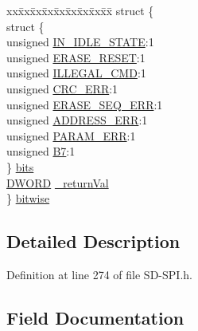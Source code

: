 \begin{DoxyCompactItemize}
\begin{tabbing}
\end{tabbing}\item 
\begin{tabbing}
xx\=xx\=xx\=xx\=xx\=xx\=xx\=xx\=xx\=\kill
struct \{\\
\>struct \{\\
\>\>unsigned \hyperlink{union_r_e_s_p_o_n_s_e__7_aacd57ecac9535b8bbec237cd7b8f1d5b}{IN\_IDLE\_STATE}:1\\
\>\>unsigned \hyperlink{union_r_e_s_p_o_n_s_e__7_a732e20ed50aafc3cc46fea840b0db62a}{ERASE\_RESET}:1\\
\>\>unsigned \hyperlink{union_r_e_s_p_o_n_s_e__7_ad0ff111a5b1536c0a0929f4d4abe187f}{ILLEGAL\_CMD}:1\\
\>\>unsigned \hyperlink{union_r_e_s_p_o_n_s_e__7_a5398e0947b8fd503827274978d3b6944}{CRC\_ERR}:1\\
\>\>unsigned \hyperlink{union_r_e_s_p_o_n_s_e__7_a9b3e70b8700e18c59f4ef0a7aa636b9a}{ERASE\_SEQ\_ERR}:1\\
\>\>unsigned \hyperlink{union_r_e_s_p_o_n_s_e__7_a245b3cd89542e3152c04b924b8aa2446}{ADDRESS\_ERR}:1\\
\>\>unsigned \hyperlink{union_r_e_s_p_o_n_s_e__7_a22dcbf2add4c812de207ef9a507758e3}{PARAM\_ERR}:1\\
\>\>unsigned \hyperlink{union_r_e_s_p_o_n_s_e__7_afc348e9a96bdf6c375205eb63ce6ab06}{B7}:1\\
\>\} \hyperlink{union_r_e_s_p_o_n_s_e__7_aec23b54390bc21de626eb12cc9f544dd}{bits}\\
\>\hyperlink{_generic_type_defs_8h_ad342ac907eb044443153a22f964bf0af}{DWORD} \hyperlink{union_r_e_s_p_o_n_s_e__7_aa96c16eea9a595aa40e24d2b22f5b725}{\_returnVal}\\
\} \hyperlink{union_r_e_s_p_o_n_s_e__7_afe9e4f8f3299765103dc1a0412e7de2d}{bitwise}\\

\end{tabbing}\end{DoxyCompactItemize}


\subsection{Detailed Description}


Definition at line 274 of file S\+D-\/\+S\+P\+I.\+h.



\subsection{Field Documentation}
\hypertarget{union_r_e_s_p_o_n_s_e__7_aad6b25752650539bbd15773c4b71b4d4}{}
